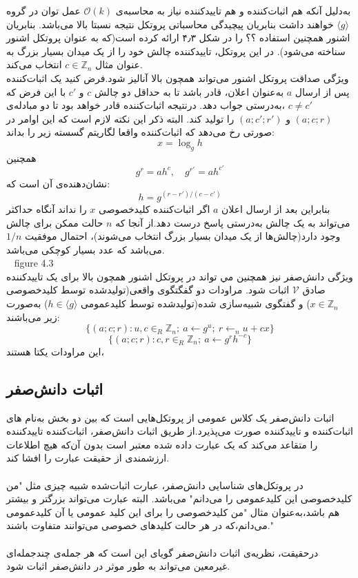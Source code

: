 به‌دلیل آنکه هم اثبات‌کننده و هم تاییدکننده نیاز به  محاسبه‌ی 
$\mathcal{O}(k)$
عمل توان در گروه
$\langle g \rangle$
خواهند داشت بنابریان پیچیدگی محاسباتی پروتکل نتیجه نسبتا بالا می‌باشد. بنابریان اشنور همچنین استفاده ؟؟ را در شکل ۴٫۳ ارائه کرده است(که به عنوان پروتکل اشنور سناخته می‌شود). در این پروتکل، تاییدکننده چالش خود را از یک  میدان بسیار بزرگ به عنوان مثال
$c \in \mathbb{Z}_n$
انتخاب می‌کند.
\\


ویژگی صداقت پروتکل اشنور می‌تواند همچون بالا آنالیز شود.فرض کنید یک اثبات‌کننده  پس از ارسال 
$a$
به‌عنوان اعلان،
قادر باشد تا به حداقل دو چالش 
$c$
و
$c'$ 
با این فرض که
$c \neq c'$
،به‌درستی جواب دهد. درنتیجه اثبات‌کننده قادر خواهد بود تا دو مبادله‌ی
$(a;c;r)$
و
$(a;c';r')$
را تولید کند. البته ذکر این نکته لازم است که این اوامر در صورتی رخ می‌دهد که اثبات‌کننده واقعا لگاریتم گسسته زیر را بداند:
$$ x = \log_g h $$
همچنین 
$$ g^r = ah^c , \quad g^{r'} = ah^{c'}  $$
نشان‌دهنده‌ی آن است که:
$$ h = g^{(r-r') / (c-c')} $$
بنابراین 
بعد از ارسال اعلان 
$a$
اگر اثبات‌کننده کلیدخصوصی
$x$
را نداند آنگاه حداکثر می‌تواند به یک چالش به‌درستی پاسخ درست دهد.از آنجا که 
$n$
حالت ممکن برای چالش وجود دارد(چالش‌ها از یک میدان بسیار بزرگ انتخاب می‌شوند)، احتمال موفقیت 
$1 / n$
می‌باشد که عدد بسیار کوچکی می‌باشد.
\\
~
figure 4.3
~
\\
ویژگی دانش‌صفر نیز همچنین مي تواند در پروتکل اشنور همچون بالا برای یک تاییدکننده صادق 
$\mathcal{V}$
اثبات شود. مراودات دو گفگتگوی واقعی(تولیدشده توسط کلیدخصوصی 
$x \in \mathbb{Z}_n$)
و گفتگوی شبیه‌سازی شده‌(تولیدشده توسط کلیدعمومی
$h \in \langle g \rangle$)
به‌صورت زیر می‌باشند:
$$\{ (a;c;r) :‌u,c \in_R \mathbb{Z}_n ;~ a \leftarrow g^u ;~ r {\leftarrow}_n u+cx \}$$
$$\{ (a;c;r) : c,r \in_R \mathbb{Z}_n ;~ a \leftarrow g^rh^{-c} \}$$
این مراودات یکتا هستند،


\newpage
\subsection{اثبات دانش‌صفر}\label{zero_knowledge_proof}
اثبات دانش‌صفر یک کلاس عمومی از پروتکل‌هایی است که بین دو بخش به‌نام های اثبات‌کننده و تاییدکننده صورت می‌پذیرد.از طریق اثبات دانش‌صفر، اثبات‌کننده تاییدکننده را متقاعد می‌کند که یک عبارت داده شده معتبر است بدون آن‌که هیچ اطلاعات ارزشمندی از حقیقت عبارت را افشا کند.
\\
\\
در پروتکل‌های شناسایی دانش‌صفر، عبارت اثبات‌شده شبیه چیزی مثل "من کلیدخصوصی این کلیدعمومی را می‌دانم" می‌باشد. البته عبارت می‌تواند بزرگتر و بیشتر هم باشد،به‌عنوان مثال "من کلیدخصوصی را برای این کلید عمومی یا آن کلیدعمومی می‌دانم،که در هر حالت کلیدهای خصوصی می‌توانند متفاوت باشند."
\\
\\
درحقیقت، نظریه‌ی اثبات دانش‌صفر گویای این است که هر جمله‌ی چندجمله‌ای غیرمعین
می‌تواند به طور موثر در دانش‌صفر اثبات شود.

